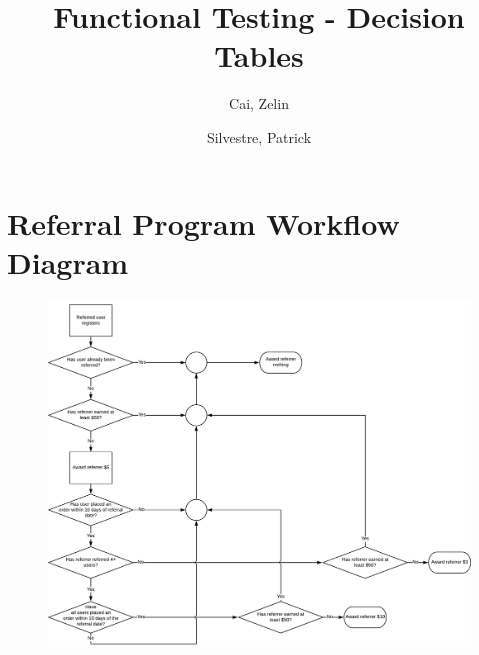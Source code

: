 \documentclass[10pt,letterpaper]{article}
\title{Functional Testing - Decision Tables}
\author{
	Cai, Zelin\\
	\and
	Silvestre, Patrick\\
}
\date{}
\begin{document}
\maketitle
\newpage
\section{Referral Program Workflow Diagram}
\begin{figure}[h]
	\centerline{\includegraphics[width=18cm]{workflow.png}}
\end{figure}
\end{document}
